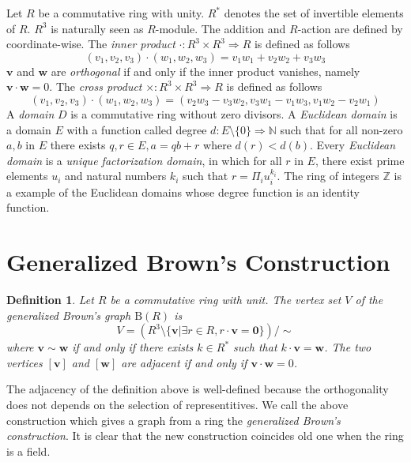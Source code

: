 \documentclass{article}
\newtheorem{Def}{Definition}
\newcommand{\Z}{\mathbb Z}
\newcommand{\N}{\mathbb N}
\newcommand{\B}{\mathrm{B}}
\begin{document}
\iffalse

The {\it tensor product} of two graphs $G_1=(V_1,E_1),G_2=(V_2,E_2)$ is a graph $G_1 \otimes G_2$ such that the vertex set is a cartesian product of $V_1$ and $V_2$ and two vertices $(v_1,v_2) \sim (w_1,w_2)$ if and only if $v_1 \sim v_2$ and $w_1 \sim w_2$. If $G_1, G_2$ are regular, the tensor product $G_1 \times G_2$ is also regular. 

\fi

Let $R$ be a commutative ring with unity. 
$R^*$ denotes the set of invertible elements of $R$.
$R^3$ is naturally seen as $R$-module. 
The addition and $R$-action are defined by coordinate-wise.
The {\it inner product} $\cdot: R^3 \times R^3 \Rightarrow R$ is defined as follows
\[ (v_1,v_2,v_3) \cdot (w_1,w_2,w_3) = v_1 w_1 + v_2 w_2 + v_3 w_3 \]
${\bm v}$ and ${\bm w}$ are {\it orthogonal} if and only if the inner product vanishes, namely ${\bm v} \cdot {\bm w} = 0$.
The {\it cross product} $\times: R^3 \times R^3 \Rightarrow R$ is defined as follows
\[ (v_1,v_2,v_3) \cdot (w_1,w_2,w_3) = ( v_2 w_3 - v_3 w_2, v_3 w_1 - v_1 w_3, v_1 w_2 - v_2 w_1 ) \]
A {\it domain} $D$ is a commutative ring without zero divisors.
A {\it Euclidean domain} is a domain $E$ with a function called degree $d: E \setminus \{0\} \Rightarrow \N$ such that for all non-zero $a,b$ in $E$ there exists $q,r \in E, a = q b + r$ where $d(r) < d(b)$. Every {\it Euclidean domain} is a {\it unique factorization domain}, in which for all $r$ in $E$, there exist prime elements $u_i$ and natural numbers $k_i$ such that $r = \Pi_i u_i^{k_i}$.
The ring of integers $\Z$ is a example of the Euclidean domains whose degree function is an identity function.


\section{Generalized Brown's Construction}
\begin{Def}
Let $R$ be a commutative ring with unit. The vertex set $V$ of the generalized Brown's graph $\B(R)$ is \[ V = ( R^3 \setminus \{\bm v | \exists r \in R, r \cdot {\bm v} = {\bm 0} \} ) / \sim\]
where $\bm v \sim \bm w$ if and only if there exists $k \in R^*$ such that $k \cdot {\bm v} = {\bm w}$. The two vertices $[\bm v]$ and $[\bm w]$ are adjacent if and only if ${\bm v} \cdot {\bm w} = 0$.
\end{Def}

The adjacency of the definition above is well-defined because the orthogonality does not depends on the selection of representitives. We call the above construction which gives a graph from a ring the {\it generalized Brown's construction}. It is clear that the new construction coincides old one when the ring is a field. 
\end{document}
